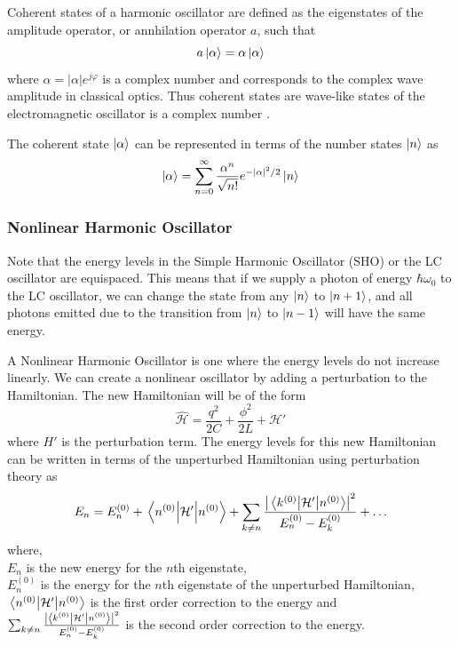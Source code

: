 Coherent states of a harmonic oscillator are defined as the eigenstates of the amplitude operator, or annhilation operator $a$, such that
\begin{equation}
a\ket{\alpha} = \alpha\ket{\alpha}
\end{equation}
where $\alpha = |\alpha|e^{j\varphi}$ is a complex number and corresponds to the complex wave amplitude in classical optics. Thus coherent states are wave-like states of the electromagnetic oscillator is a complex number \cite{Glauber1963}.

The coherent state $\ket{\alpha}$ can be represented in terms of the number states $\ket{n}$ as
\begin{equation}
\ket{\alpha} = \sum_{n=0}^\infty \frac{\alpha^n}{\sqrt{n!}}e^{-|\alpha|^2/2}\ket{n}
\label{eqn:glauber expansion}
\end{equation}

\subsubsection{Nonlinear Harmonic Oscillator}

Note that the energy levels in the Simple Harmonic Oscillator (SHO) or the LC oscillator are equispaced. This means that if we supply a photon of energy $\hbar\omega_0$ to the LC oscillator, we can change the state from any $\ket{n}$ to $\ket{n+1}$, and all photons emitted due to the transition from $\ket{n}$ to $\ket{n-1}$ will have the same energy.

A Nonlinear Harmonic Oscillator is one where the energy levels do not increase linearly. We can create a nonlinear oscillator by adding a perturbation to the Hamiltonian. The new Hamiltonian will be of the form
\begin{equation}
\hat{\mathcal{H}}=\frac{q^2}{2C}+\frac{\phi^2}{2L} +\mathcal{H}'
\end{equation}
where $H'$ is the perturbation term.
The energy levels for this new Hamiltonian can be written in terms of the unperturbed Hamiltonian using perturbation theory as
\begin{equation}
E_n=E_n^{(0)}+\expval{\mathcal{H}'}{n^{(0)}}+\sum_{k\neq n}\frac{\left|\mel{k^{(0)}}{\mathcal{H}'}{n^{(0)}}\right|^2}{E_n^{(0)}-E_k^{(0)}}+\ldots
\end{equation}
where,\\
$E_n$ is the new energy for the $n$th eigenstate,\\
$E_n^{(0)}$ is the energy for the $n$th eigenstate of the unperturbed Hamiltonian,\\
$\expval{\mathcal{H}'}{n^{(0)}}$ is the first order correction to the energy and\\
$\sum_{k\neq n}\frac{\left|\mel{k^{(0)}}{\mathcal{H}'}{n^{(0)}}\right|^2}{E_n^{(0)}-E_k^{(0)}}$ is the second order correction to the energy.

